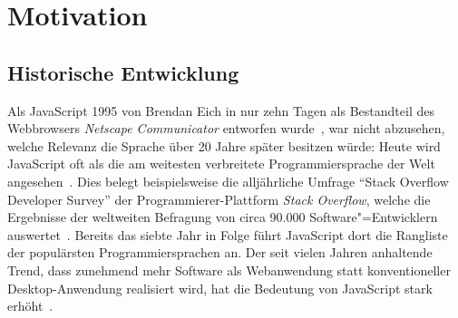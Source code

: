 \chapter{Motivation}
\label{chap:motiviation}

\section{Historische Entwicklung}

Als JavaScript 1995 von Brendan Eich in nur zehn Tagen als Bestandteil des Webbrowsers \textit{Netscape Communicator} entworfen wurde~\autocite{SEVERANCE:2012}, war nicht abzusehen, welche Relevanz die Sprache über 20 Jahre später besitzen würde: Heute wird JavaScript oft als die am weitesten verbreitete Programmiersprache der Welt angesehen~\autocite{PAULSON:2007,CROCKFORD:JS_POPULAR}. Dies belegt beispielsweise die alljährliche Umfrage \enquote{Stack Overflow Developer Survey} der Programmierer-Plattform \textit{Stack Overflow}, welche die Ergebnisse der weltweiten Befragung von circa 90.000 Software"=Entwicklern auswertet~\autocite{STACKOVERFLOW:SURVEY}. Bereits das siebte Jahr in Folge führt JavaScript dort die Rangliste der populärsten Programmiersprachen an.
Der seit vielen Jahren anhaltende Trend, dass zunehmend mehr Software als Webanwendung statt konventioneller Desktop-Anwendung realisiert wird, hat die Bedeutung von JavaScript stark erhöht~\autocite{TAIVALSAARI:2017,CASTELEYN:2014}.

